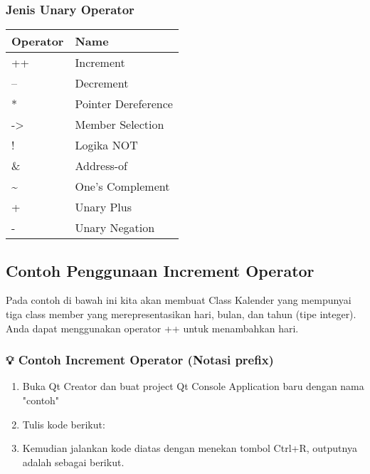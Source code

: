 

\subsubsection{Jenis Unary Operator}

\begin{longtable}[]{@{}ll@{}}
\toprule
\textbf{Operator} & \textbf{Name} \\
\midrule
\endhead
++ & Increment \\
-- & Decrement \\
* & Pointer Dereference \\
-> & Member Selection \\
! & Logika NOT \\
\& & Address-of \\
\textasciitilde{} & One's Complement \\
+ & Unary Plus \\
- & Unary Negation \\
\bottomrule
\end{longtable}

\subsection{Contoh Penggunaan Increment Operator}

Pada contoh di bawah ini kita akan membuat Class Kalender yang mempunyai tiga class member yang merepresentasikan hari, bulan, dan tahun (tipe integer). Anda dapat menggunakan operator ++ untuk menambahkan hari.

\subsubsection*{💡 Contoh Increment Operator (Notasi prefix)}

\begin{enumerate}
\item Buka Qt Creator dan buat project Qt Console Application baru dengan nama "contoh"
\item Tulis kode berikut:




\item
  Kemudian jalankan kode diatas dengan menekan tombol Ctrl+R, outputnya
  adalah sebagai berikut.
\end{enumerate}


